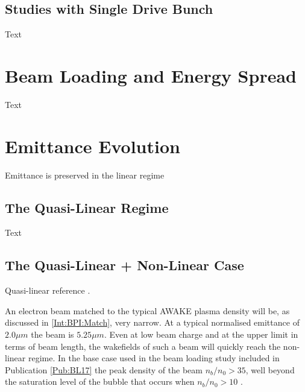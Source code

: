 \subsection{Studies with Single Drive Bunch}
\label{Sim:PBSingle}

Text


\section{Beam Loading and Energy Spread}
\label{Sim:BLoad}

Text


\section{Emittance Evolution}
\label{Sim:Emitt}

Emittance is preserved in the linear regime


\subsection{The Quasi-Linear Regime}
\label{Sim:QLin}

Text


\subsection{The Quasi-Linear + Non-Linear Case}
\label{Sim:QLinNonLin}

Quasi-linear reference \cite{rosenzweig:2010}.

An electron beam matched to the typical AWAKE plasma density will be, as discussed in \ref{Int:BPI:Match}, very narrow. At a typical normalised emittance of $2.0\unit{\mu m}$ the beam is $5.25\unit{\mu m}$. Even at low beam charge and at the upper limit in terms of beam length, the wakefields of such a beam will quickly reach the non-linear regime. In the base case used in the beam loading study included in Publication \ref{Pub:BL17} \cite{berglyd_olsen:2018} the peak density of the beam $n_b/n_0 > 35$, well beyond the saturation level of the bubble that occurs when $n_b/n_0 > 10$ \cite{lu:2005}.

